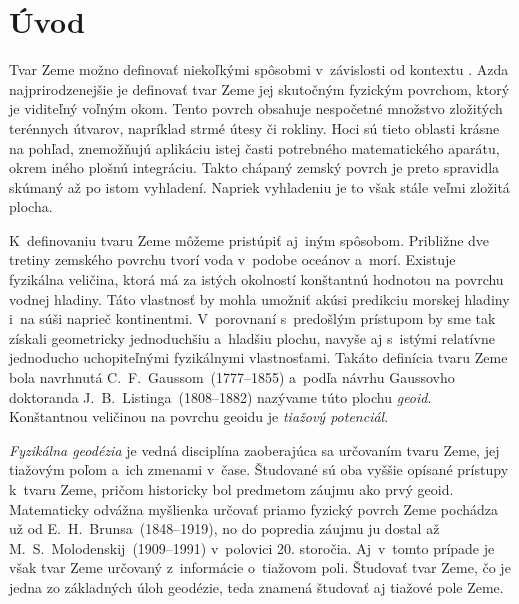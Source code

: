 \documentclass[a4paper, 12pt]{book}
\begin{document}
\tableofcontents
\newpage







\chapter*{Úvod}
\label{sec:introduction}

Tvar Zeme možno definovať niekoľkými spôsobmi v~závislosti od kontextu 
\parencite{MoritzTheFigureOfTheEarth}.  Azda najprirodzenejšie je definovať 
tvar Zeme jej skutočným fyzickým povrchom, ktorý je viditeľný voľným okom.  
Tento povrch obsahuje nespočetné množstvo zložitých terénnych útvarov, 
napríklad strmé útesy či rokliny.  Hoci sú tieto oblasti krásne na pohľad, 
znemožňujú aplikáciu istej časti potrebného matematického aparátu, okrem iného 
plošnú integráciu.  Takto chápaný zemský povrch je preto spravidla skúmaný až 
po istom vyhladení.  Napriek vyhladeniu je to však stále veľmi zložitá plocha.

K~definovaniu tvaru Zeme môžeme pristúpiť aj~iným spôsobom.  Približne dve 
tretiny zemského povrchu tvorí voda v~podobe oceánov a~morí.  Existuje 
fyzikálna veličina, ktorá má za istých okolností konštantnú hodnotou na povrchu 
vodnej hladiny.  Táto vlastnosť by mohla umožniť akúsi predikciu morskej 
hladiny i~na súši naprieč kontinentmi.  V~porovnaní s~predošlým prístupom by 
sme tak získali geometricky jednoduchšiu a~hladšiu plochu, navyše aj s~istými 
relatívne jednoducho uchopiteľnými fyzikálnymi vlastnosťami.  Takáto definícia 
tvaru Zeme bola navrhnutá C.~F.~Gaussom~(1777--1855) a~podľa návrhu Gaussovho 
doktoranda J.~B.~Listinga~(1808--1882) nazývame túto plochu \emph{geoid}.  
Konštantnou veličinou na povrchu geoidu je \emph{tiažový potenciál}.

\emph{Fyzikálna geodézia} je vedná disciplína zaoberajúca sa určovaním tvaru 
Zeme, jej tiažovým poľom a~ich zmenami v~čase.  Študované sú oba vyššie opísané 
prístupy k~tvaru Zeme, pričom historicky bol predmetom záujmu ako prvý geoid.  
Matematicky odvážna myšlienka určovať priamo fyzický povrch Zeme pochádza už od 
E.~H.~Brunsa~(1848--1919), no do popredia záujmu ju dostal až 
M.~S.~Molodenskij~(1909--1991) v~polovici 20. storočia.  Aj~v~tomto prípade je 
však tvar Zeme určovaný z~informácie o~tiažovom poli.  Študovať tvar Zeme, čo 
je jedna zo základných úloh geodézie, teda znamená študovať aj tiažové pole 
Zeme.
\end{document}
